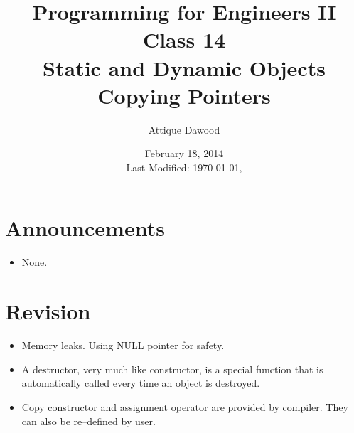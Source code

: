 \documentclass[12pt,a4paper]{article}
\title{\vspace{-2cm}Programming for Engineers II\\Class 14\\Static and Dynamic Objects\\Copying Pointers}
\author{Attique Dawood}
\date{February 18, 2014\\[0.2cm] Last Modified: \today, \currenttime}
\begin{document}
\maketitle
\section{Announcements}
\begin{itemize}
\item None.
\end{itemize}
\section{Revision}
\begin{itemize}
\item Memory leaks. Using NULL pointer for safety.
\item A destructor, very much like constructor, is a special function that is automatically called every time an object is destroyed.
\item Copy constructor and assignment operator are provided by compiler. They can also be re--defined by user.
\end{itemize}
\end{document}
